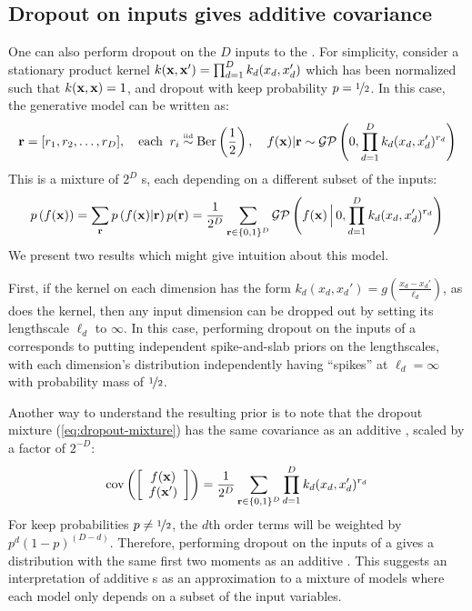 \subsection{Dropout on inputs gives additive covariance}
One can also perform dropout on the $D$ inputs to the \gp{}.
For simplicity, consider a stationary product kernel ${k({\bf{x}}, {\bf{x}}') = \prod_{d=1}^D k_d(x_d, x_d')}$ which has been normalized such that $k({\bf{x}}, {\bf{x}}) = 1$, and dropout with keep probability $p = \nicefrac{1}{2}$.
In this case, the generative model can be written as:
%
\begin{align}
{\bf{r}} = [r_1, r_2, \dots, r_D], \quad \textnormal{each} \;\; r_i \overset{\mbox{\tiny iid}}{\sim} \textnormal{Ber} \left( \frac{1}{2} \right), \quad f({\bf{x}}) | {\bf{r}} \sim \mathcal{GP} \left( 0, \prod_{d=1}^D k_d(x_d, x_d')^{r_d} \right)
\end{align}
%
This is a mixture of $2^D$ \gp{}s, each depending on a different subset of the inputs:
%
\begin{align}
p \left( f({\bf{x}}) \right) = 
\sum_{{\bf{r}}} p \left( f({\bf{x}}) | {\bf{r}} \right) p( {\bf{r}}) = 
\frac{1}{2^D} \sum_{{\bf{r}} \in \{0,1\}^D}  \mathcal{GP} \left(f({\bf{x}}) \,\Big|\, 0, \prod_{d=1}^D k_d(x_d, x_d')^{r_d} \right)
\label{eq:dropout-mixture}
\end{align}
We present two results which might give intuition about this model.

First, if the kernel on each dimension has the form ${k_d(x_d, x_d') = g \left( \frac{x_d - x_d'}{\ell_d} \right)}$, as does the \kSE{} kernel, then any input dimension can be dropped out by setting its lengthscale $\ell_d$ to $\infty$.
In this case, performing dropout on the inputs of a \gp{} corresponds to putting independent spike-and-slab priors on the lengthscales, with each dimension's distribution independently having ``spikes'' at $\ell_d = \infty$ with probability mass of $\nicefrac{1}{2}$.



Another way to understand the resulting prior is to note that the dropout mixture (\cref{eq:dropout-mixture}) has the same covariance as an additive \gp{}, scaled by a factor of $2^{-D}$:
\begin{align}
\operatorname{cov}\left( \left[ \begin{array}{c} {f({\bf{x}})} \\ {f({\bf{x}}')} \end{array} \right] \right) = \frac{1}{2^{D}} \sum_{{\bf{r}} \in \{0,1\}^D}  \prod_{d=1}^D k_d(x_d, x_d')^{r_d}
\label{eq:dropout-mixture-covariance}
\end{align}
%
For keep probabilities $p \neq \nicefrac{1}{2}$, the $d$th order terms will be weighted by $p^{d}(1-p)^{(D-d)}$.
Therefore, performing dropout on the inputs of a \gp{} gives a distribution with the same first two moments as an additive \gp{}.
This suggests an interpretation of additive \gp{}s as an approximation to a mixture of models where each model only depends on a subset of the input variables.






